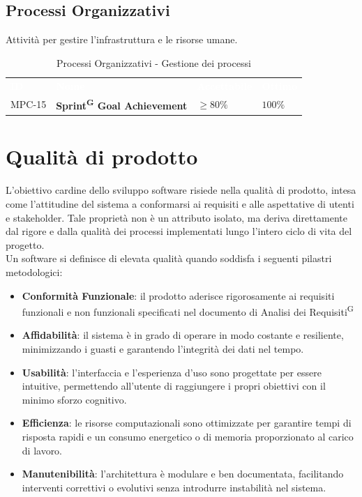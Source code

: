 \documentclass[a4paper, 11pt]{article}
\begin{document}
\subsection{Processi Organizzativi}
Attività per gestire l'infrastruttura e le risorse umane.
\begin{table}[h!]
    \centering
    \begin{tabular}{>{\centering\arraybackslash}m{1.5cm} p{6cm} >{\centering\arraybackslash}m{3cm} >{\centering\arraybackslash}m{2.5cm}}
        \rowcolor{AccentColor}
        \textcolor{white}{\textbf{ID}} & \textcolor{white}{\textbf{Nome}} & \textcolor{white}{\textbf{Accettabile}} & \textcolor{white}{\textbf{Ottimo}} \\
        
        MPC-15 & \textbf{Sprint\textsuperscript{G} Goal Achievement} & $\geq 80\%$ & $100\%$ \\
    \end{tabular}
    \caption{Processi Organizzativi - Gestione dei processi}
\end{table}

\newpage 

\section{Qualità di prodotto}
L'obiettivo cardine dello sviluppo software risiede nella qualità di prodotto, intesa come l'attitudine del sistema a conformarsi ai requisiti e alle aspettative di utenti e stakeholder. Tale proprietà non è un attributo isolato, ma deriva direttamente dal rigore e dalla qualità dei processi implementati lungo l'intero ciclo di vita del progetto.
\\
Un software si definisce di elevata qualità quando soddisfa i seguenti pilastri metodologici:
\begin{itemize}
    \item \textbf{Conformità Funzionale}: il prodotto aderisce rigorosamente ai requisiti funzionali e non funzionali specificati nel documento di Analisi dei Requisiti\textsuperscript{G} 
    \item \textbf{Affidabilità}: il sistema è in grado di operare in modo costante e resiliente, minimizzando i guasti e garantendo l'integrità dei dati nel tempo.
    \item \textbf{Usabilità}: l'interfaccia e l'esperienza d'uso sono progettate per essere intuitive, permettendo all'utente di raggiungere i propri obiettivi con il minimo sforzo cognitivo.
    \item \textbf{Efficienza}: le risorse computazionali sono ottimizzate per garantire tempi di risposta rapidi e un consumo energetico o di memoria proporzionato al carico di lavoro.
    \item \textbf{Manutenibilità}: l'architettura è modulare e ben documentata, facilitando interventi correttivi o evolutivi senza introdurre instabilità nel sistema.
\end{itemize}
\end{document}
